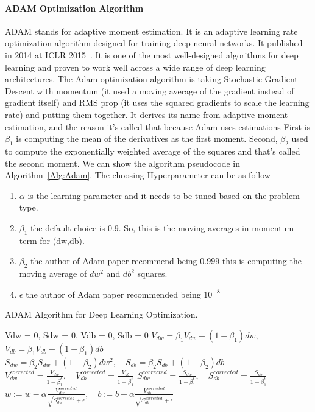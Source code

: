 \paragraph{ADAM Optimization Algorithm}
ADAM stands for adaptive moment estimation. It is an adaptive learning rate optimization algorithm designed for training deep neural networks. It published in 2014 at ICLR 2015~\cite{Adam_2014}. It is one of the most well-designed algorithms for deep learning and proven to work well across a wide range of deep learning architectures. The Adam optimization algorithm is taking Stochastic Gradient Descent with momentum (it used a moving average of the gradient instead of gradient itself) and RMS prop (it uses the squared gradients to scale the learning rate) and putting them together. It derives its name from adaptive moment estimation, and the reason it’s called that because Adam uses estimations First is $\beta_1$ is computing the mean of the derivatives as the first moment. Second, $\beta_2$ used to compute the exponentially weighted average of the squares and that’s called the second moment. We can show the algorithm pseudocode in Algorithm~\ref{Alg:Adam}. The choosing Hyperparameter can be as follow

\begin{enumerate}
\item $\alpha$ is the learning parameter and it needs to be tuned based on the problem type.
\item $\beta_1$ the default choice is 0.9. So, this is the moving averages in momentum term for (dw,db).
\item $\beta_2$ the author of Adam paper recommend being $0.999$ this is computing the moving average of $dw^2$ and $db^2$ squares.
  \item $\epsilon$ the author of Adam paper recommended being $10^{-8}$ 
  \end{enumerate}

\begin{algorithm}
  \caption{ADAM Algorithm for Deep Learning Optimization.}\label{Alg:Adam}

  \begin{algorithmic}
    \State Vdw = 0, Sdw = 0, Vdb = 0, Sdb = 0
     
    \State $V_{dw} = \beta_1 V_{dw} + (1-\beta_1) dw,$\quad$ V_{db} = \beta_1 V_{db} + (1-\beta_1) db$ 
    \State $S_{dw} = \beta_2 S_{dw} + (1-\beta_2) dw^2,\quad S_{db} = \beta_2 S_{db} + (1-\beta_2) db$ 
    \State $V_{dw}^{corrected} = \frac{V_{dw}}{1-\beta_1^t} ,\quad  V_{db}^{corrected} = \frac{V_{db}}{1-\beta_1^t} $
    \State $S_{dw}^{corrected} = \frac{S_{dw}}{1-\beta_1^t} ,\quad S_{db}^{corrected} = \frac{S_{db}}{1-\beta_1^t} $
    \State $w:= w-\alpha \frac{V_{dw}^{corrected}}{\sqrt{S_{dw}^{corrected}} + \epsilon},\quad b:= b-\alpha \frac{V_{db}^{corrected}}{\sqrt{S_{db}^{corrected}} + \epsilon}$
    \EndFor
  \end{algorithmic}
\end{algorithm}

